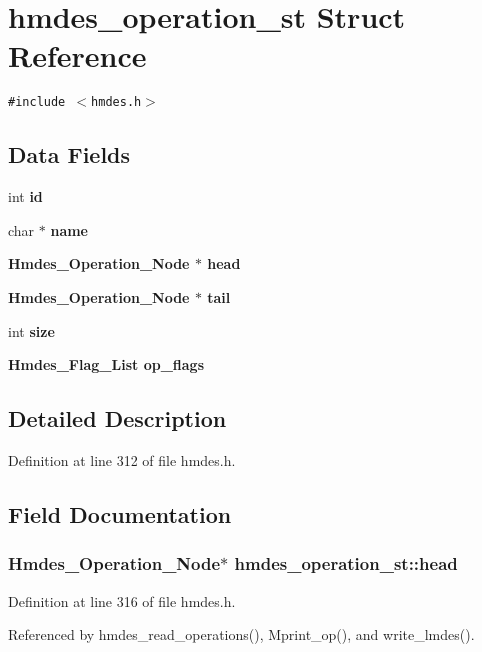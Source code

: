 \section{hmdes\_\-operation\_\-st Struct Reference}
\label{structhmdes__operation__st}
{\tt \#include $<$hmdes.h$>$}

\subsection*{Data Fields}
\begin{CompactItemize}
\item 
int \bf{id}
\item 
char $\ast$ \bf{name}
\item 
\bf{Hmdes\_\-Operation\_\-Node} $\ast$ \bf{head}
\item 
\bf{Hmdes\_\-Operation\_\-Node} $\ast$ \bf{tail}
\item 
int \bf{size}
\item 
\bf{Hmdes\_\-Flag\_\-List} \bf{op\_\-flags}
\end{CompactItemize}


\subsection{Detailed Description}




Definition at line 312 of file hmdes.h.

\subsection{Field Documentation}
\subsubsection{\setlength{\rightskip}{0pt plus 5cm}\bf{Hmdes\_\-Operation\_\-Node}$\ast$ \bf{hmdes\_\-operation\_\-st::head}}\label{structhmdes__operation__st_a71caa844d56d1d29f24107be85231c5}




Definition at line 316 of file hmdes.h.

Referenced by hmdes\_\-read\_\-operations(), Mprint\_\-op(), and write\_\-lmdes().
